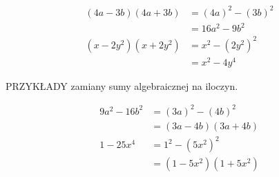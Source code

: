 \documentclass[10pt]{article}
\begin{document}
\[
\begin{aligned}
(4 a-3 b)(4 a+3 b) & =(4 a)^{2}-(3 b)^{2} \\
& =16 a^{2}-9 b^{2} \\
\left(x-2 y^{2}\right)\left(x+2 y^{2}\right) & =x^{2}-\left(2 y^{2}\right)^{2} \\
& =x^{2}-4 y^{4}
\end{aligned}
\]

PRZYKŁADY zamiany sumy algebraicznej na iloczyn.

\[
\begin{aligned}
9 a^{2}-16 b^{2} & =(3 a)^{2}-(4 b)^{2} \\
& =(3 a-4 b)(3 a+4 b) \\
1-25 x^{4} & =1^{2}-\left(5 x^{2}\right)^{2} \\
& =\left(1-5 x^{2}\right)\left(1+5 x^{2}\right)
\end{aligned}
\]
\end{document}
